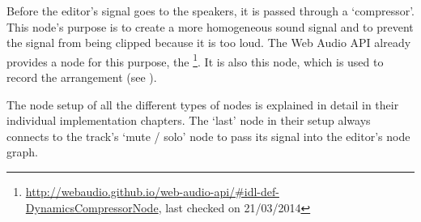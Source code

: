 Before the editor's signal goes to the speakers, it is passed through a `compressor'. This node's purpose is to create a more homogeneous sound signal and to prevent the signal from being clipped because it is too loud. The Web Audio API already provides a node for this purpose, the \footnote{\url{http://webaudio.github.io/web-audio-api/\#idl-def-DynamicsCompressorNode}, last checked on 21/03/2014}. It is also this node, which is used to record the arrangement (see ).

The node setup of all the different types of nodes is explained in detail in their individual implementation chapters. The `last' node in their setup always connects to the track's `mute / solo' node to pass its signal into the editor's node graph.